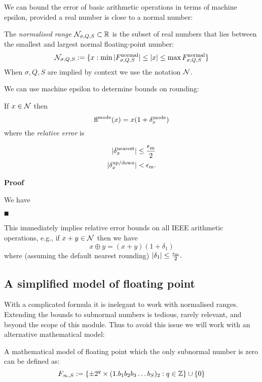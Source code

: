We can bound the error of basic arithmetic operations in terms of machine epsilon, provided a real number is close to a normal number:

\begin{definition} The \emph{normalised range} ${\cal N}_{\sigma,Q,S} \subset {\mathbb R}$ is the subset of real numbers that lies between the smallest and largest normal floating-point number:
\[
{\cal N}_{\ensuremath{\sigma},Q,S} := \{x : \min |F_{\ensuremath{\sigma},Q,S}^{\rm normal}| \ensuremath{\leq} |x| \ensuremath{\leq} \max F_{\ensuremath{\sigma},Q,S}^{\rm normal} \}
\]
When $\ensuremath{\sigma},Q,S$ are implied by context we use the notation ${\cal N}$. \end{definition}

We can use machine epsilon to determine bounds on rounding:

\begin{proposition} If $x \in {\cal N}$ then
\[
{\rm fl}^{\rm mode}(x) = x (1 + \ensuremath{\delta}_x^{\rm mode})
\]
where the \emph{relative error} is


\begin{align*}
|\ensuremath{\delta}_x^{\rm nearest}| &\ensuremath{\leq} {\ensuremath{\epsilon}_{\rm m} \over 2} \\
|\ensuremath{\delta}_x^{\rm up/down}| &< {\ensuremath{\epsilon}_{\rm m}}.
\end{align*}
\end{proposition}
\textbf{Proof}

We have

\ensuremath{\QED}

This immediately implies relative error bounds on all IEEE arithmetic operations, e.g., if $x+y \in {\cal N}$ then we have
\[
x \ensuremath{\oplus} y = (x+y) (1 + \ensuremath{\delta}_1)
\]
where (assuming the default nearest rounding) $|\ensuremath{\delta}_1| \ensuremath{\leq} {\ensuremath{\epsilon}_{\rm m} \over 2}.$

\subsection{A simplified model of floating point}
With a complicated formula it is inelegant to work with normalised ranges. Extending the bounds to subnormal numbers is tedious, rarely relevant, and beyond the scope of this module. Thus to avoid this issue we will work with an alternative mathematical model:

\begin{definition} A mathematical model of floating point which the only subnormal number is zero can be defined as:
\[
F_{\infty,S} := \{\pm 2^q \times (1.b_1b_2b_3\ldots b_S)_2 :  q \in {\mathbb Z} \} \cup \{0\}
\]
\end{definition}


